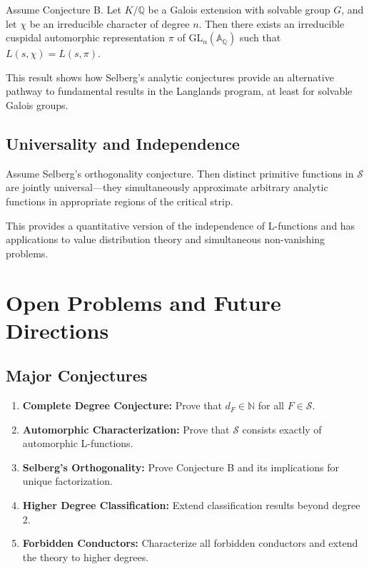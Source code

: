 \begin{theorem}
Assume Conjecture B. Let $K/\mathbb{Q}$ be a Galois extension with solvable group $G$, and let $\chi$ be an irreducible character of degree $n$. Then there exists an irreducible cuspidal automorphic representation $\pi$ of $\text{GL}_n(\mathbb{A}_\mathbb{Q})$ such that $L(s,\chi) = L(s,\pi)$.
\end{theorem}

This result shows how Selberg's analytic conjectures provide an alternative pathway to fundamental results in the Langlands program, at least for solvable Galois groups.

\subsection{Universality and Independence}

\begin{theorem}
Assume Selberg's orthogonality conjecture. Then distinct primitive functions in $\mathcal{S}$ are jointly universal---they simultaneously approximate arbitrary analytic functions in appropriate regions of the critical strip.
\end{theorem}

This provides a quantitative version of the independence of L-functions and has applications to value distribution theory and simultaneous non-vanishing problems.

\section{Open Problems and Future Directions}

\subsection{Major Conjectures}

\begin{enumerate}
\item \textbf{Complete Degree Conjecture:} Prove that $d_F \in \mathbb{N}$ for all $F \in \mathcal{S}$.

\item \textbf{Automorphic Characterization:} Prove that $\mathcal{S}$ consists exactly of automorphic L-functions.

\item \textbf{Selberg's Orthogonality:} Prove Conjecture B and its implications for unique factorization.

\item \textbf{Higher Degree Classification:} Extend classification results beyond degree 2.

\item \textbf{Forbidden Conductors:} Characterize all forbidden conductors and extend the theory to higher degrees.
\end{enumerate}

